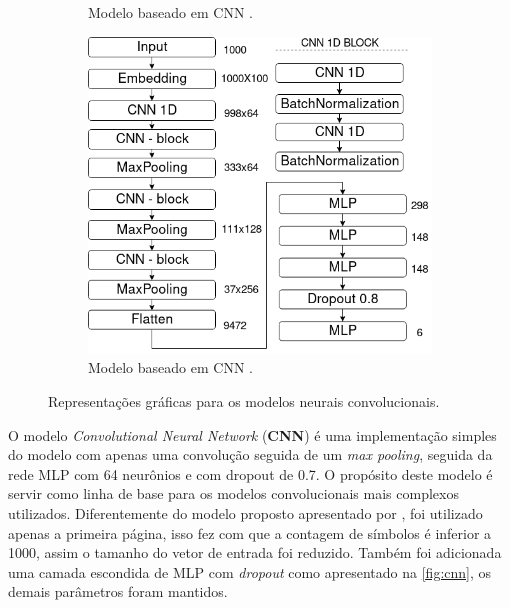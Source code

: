 \begin{figure}
\begin{subfigure}[b]{0.4\textwidth}
        \caption{Modelo baseado em CNN \cite{kim_convolutional_2014}.}
        \label{fig:cnnrand}
    \end{subfigure}\hfill
    \begin{subfigure}[b]{0.5\textwidth}
        \includegraphics[width=\textwidth]{figuras/modelos-VDCNN}
        \caption{Modelo baseado em CNN \cite{conneau_very_2017}.}
        \label{fig:vdcnn}
    \end{subfigure}
    \caption[Modelos convolucionais]{Representações gráficas para os modelos neurais convolucionais.}
\end{figure}

O modelo \textit{Convolutional Neural Network} (\textbf{CNN}) \cite{da_silva_document_2018} é uma implementação simples do modelo com apenas uma convolução
seguida de um \textit{max pooling}, seguida da rede MLP com 64 neurônios e com
dropout de 0.7. O propósito deste modelo é servir como linha de base para os
modelos convolucionais mais complexos utilizados. Diferentemente do modelo proposto apresentado por \citeauthor{da_silva_document_2018} \citeyear{da_silva_document_2018}, foi utilizado apenas a primeira página, isso fez com que a contagem de símbolos é inferior a 1000, assim o tamanho do vetor de entrada foi reduzido. Também foi adicionada uma camada escondida de MLP com \textit{dropout} como apresentado na \ref{fig:cnn}, os demais parâmetros foram mantidos.

